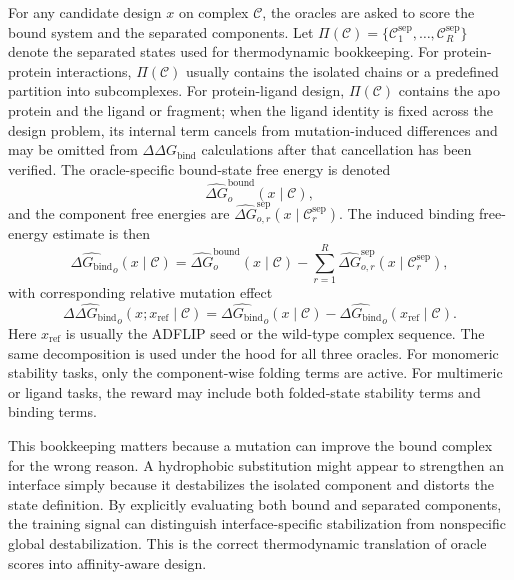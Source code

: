 \documentclass[11pt]{article}
\newcommand{\DGbind}{\ensuremath{\Delta G_{\mathrm{bind}}}}
\newcommand{\DDGbind}{\ensuremath{\Delta\Delta G_{\mathrm{bind}}}}
\begin{document}
	For any candidate design $x$ on complex $\mathcal{C}$, the oracles are asked to score the bound system and the separated components. Let $\Pi(\mathcal{C})=\{\mathcal{C}^{\mathrm{sep}}_1,\ldots,\mathcal{C}^{\mathrm{sep}}_R\}$ denote the separated states used for thermodynamic bookkeeping. For protein-protein interactions, $\Pi(\mathcal{C})$ usually contains the isolated chains or a predefined partition into subcomplexes. For protein-ligand design, $\Pi(\mathcal{C})$ contains the apo protein and the ligand or fragment; when the ligand identity is fixed across the design problem, its internal term cancels from mutation-induced differences and may be omitted from $\DDGbind$ calculations after that cancellation has been verified. The oracle-specific bound-state free energy is denoted
	\begin{equation}
		\widehat{\Delta G}^{\mathrm{bound}}_o(x\mid\mathcal{C}),
	\end{equation}
	and the component free energies are $\widehat{\Delta G}^{\mathrm{sep}}_{o,r}(x\mid\mathcal{C}^{\mathrm{sep}}_r)$. The induced binding free-energy estimate is then
	\begin{equation}
		\label{eq:binddef_v11}
		\widehat{\DGbind}_o(x\mid\mathcal{C}) = \widehat{\Delta G}^{\mathrm{bound}}_o(x\mid\mathcal{C}) - \sum_{r=1}^{R} \widehat{\Delta G}^{\mathrm{sep}}_{o,r}(x\mid\mathcal{C}^{\mathrm{sep}}_r),
	\end{equation}
	with corresponding relative mutation effect
	\begin{equation}
		\label{eq:ddgbind_v11}
		\widehat{\DDGbind}_o(x;x_{\mathrm{ref}}\mid\mathcal{C}) = \widehat{\DGbind}_o(x\mid\mathcal{C}) - \widehat{\DGbind}_o(x_{\mathrm{ref}}\mid\mathcal{C}).
	\end{equation}
	Here $x_{\mathrm{ref}}$ is usually the ADFLIP seed or the wild-type complex sequence. The same decomposition is used under the hood for all three oracles. For monomeric stability tasks, only the component-wise folding terms are active. For multimeric or ligand tasks, the reward may include both folded-state stability terms and binding terms.
	
	This bookkeeping matters because a mutation can improve the bound complex for the wrong reason. A hydrophobic substitution might appear to strengthen an interface simply because it destabilizes the isolated component and distorts the state definition. By explicitly evaluating both bound and separated components, the training signal can distinguish interface-specific stabilization from nonspecific global destabilization. This is the correct thermodynamic translation of oracle scores into affinity-aware design.
	
\end{document}
